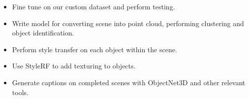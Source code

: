 \documentclass[]{article}
\begin{document}
\begin{enumerate}[(a)]
\begin{itemize}
        \item Fine tune on our custom dataset and perform testing.
        \item Write model for converting scene into point cloud, performing clustering and object identification.
        \item Perform style transfer on each object within the scene.
        \item Use StyleRF to add texturing to objects. 
        \item Generate captions on completed scenes with ObjectNet3D and other relevant tools.
    \end{itemize}
\end{enumerate}
\end{document}
